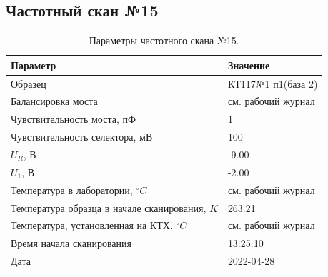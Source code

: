 \subsection{Частотный скан №15}
\begin{table}[!ht]
    \centering
    \caption{Параметры частотного скана №15.}
    \begin{tabular}{|l|l|}
        \hline
        Параметр                                       & Значение                  \\ \hline
        Образец                                        & КТ117№1 п1(база 2)        \\ \hline
        Балансировка моста                             & см. рабочий журнал        \\ \hline
        Чувствительность моста, пФ                     & 1                         \\ \hline
        Чувствительность селектора, мВ                 & 100                       \\ \hline
        $U_R$, В                                       & -9.00                     \\ \hline
        $U_1$, В                                       & -2.00                     \\ \hline
        Температура в лаборатории, $^\circ C$          & см. рабочий журнал        \\ \hline
        Температура образца в начале сканирования, $K$ & 263.21                    \\ \hline
        Температура, установленная на КТХ, $^\circ C$  & см. рабочий журнал        \\ \hline
        Время начала сканирования                      & 13:25:10                  \\ \hline
        Дата                                           & 2022-04-28                \\ \hline
    \end{tabular}
    \label{table:frequency_scan_15}
\end{table}

